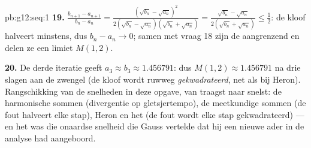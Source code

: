 \begin{solution}{pb:g12:seq:1}
\textbf{19.} $\frac{b_{n+1} - a_{n+1}}{b_n - a_n} =
\frac{(\sqrt{b_n} - \sqrt{a_n})^2}
{2(\sqrt{b_n} - \sqrt{a_n})(\sqrt{b_n} + \sqrt{a_n})}
= \frac{\sqrt{b_n} - \sqrt{a_n}}{2(\sqrt{b_n} + \sqrt{a_n})} \leq \frac12$:
de kloof halveert minstens, dus $b_n - a_n \to 0$; samen met vraag 18 zijn de
 aangrenzend en delen ze een limiet $M(1, 2)$.

\textbf{20.} De derde iteratie geeft $a_3 \approx b_3 \approx 1.456791$: dus
$M(1, 2) \approx 1.456791$ na drie slagen aan de zwengel (de kloof wordt
ruwweg \emph{gekwadrateerd}, net als bij Heron). Rangschikking van de
snelheden in deze opgave, van traagst naar snelst: de harmonische sommen
(divergentie op gletsjertempo), de meetkundige sommen (de fout halveert elke
stap), Heron en het   (de fout wordt elke
stap gekwadrateerd) --- en het was die onaardse snelheid die Gauss vertelde
dat hij een nieuwe ader in de analyse had aangeboord.
\end{solution}
